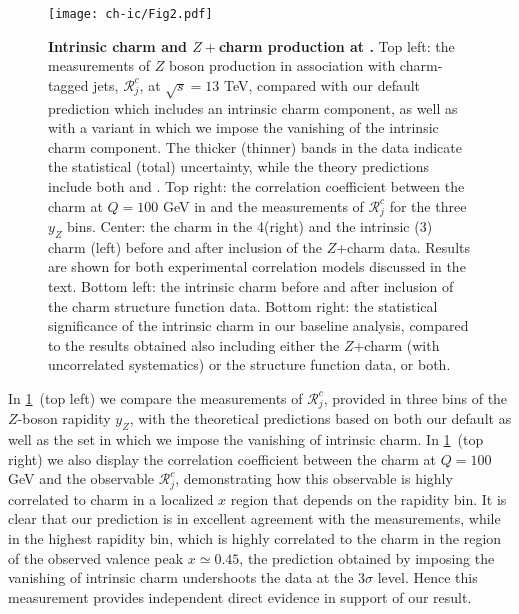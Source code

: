 \begin{figure}[htbp]
  \begin{center}
    \texttt{[image: ch-ic/Fig2.pdf]}
     \caption{\small
        \textbf{ Intrinsic charm and $Z+$charm production at \lhcb.}
        Top left: the \lhcb measurements of $Z$ boson production
        in association with charm-tagged jets, $\mathcal{R}_j^c$, at
        $\sqrt{s}=13$ TeV,  compared with our default prediction which includes
        an intrinsic charm component, as well as with a variant in which we
        impose the vanishing of the intrinsic charm component.
        The thicker (thinner) bands in the \lhcb data indicate the statistical
        (total) uncertainty, while the theory predictions include both \pdf and
        \mhou.
        Top right: the correlation coefficient between the  charm \pdf at $Q=100$
        GeV in  and the \lhcb measurements of $\mathcal{R}_j^c$  for the
        three $y_Z$ bins.
        Center: the charm \pdf in the 4\fns (right) and the intrinsic (3\fns)
        charm \pdf (left) before and after inclusion of the \lhcb $Z$+charm
        data.
        Results are shown for both experimental correlation models discussed in
        the text.
        Bottom left: the intrinsic charm \pdf before and after inclusion of the
        \emc charm structure function data.
        Bottom right: the statistical significance of the intrinsic charm \pdf
        in our baseline analysis, compared to the results obtained also
        including either the \lhcb $Z$+charm (with uncorrelated systematics) or
        the \emc structure function data, or both.
  \label{fig:ic/Zc} }
\end{center}
\end{figure}

In \cref{fig:ic/Zc}~(top left) we compare the \lhcb measurements of
$\mathcal{R}_j^c$, provided in three bins of the $Z$-boson rapidity $y_Z$, with
the theoretical predictions based on both our default \pdfs as well as the \pdf
set in which we impose the vanishing of intrinsic charm.
%
In \cref{fig:ic/Zc}~(top right) we also display the  correlation coefficient
between the  charm \pdf at $Q=100$ GeV  and the observable  $\mathcal{R}_j^c$,
demonstrating how this observable is highly correlated to charm in a localized
$x$ region that depends on the rapidity bin.
%
It is clear that our prediction is in excellent agreement with the \lhcb
measurements, while in the highest rapidity bin, which is highly correlated to
the charm \pdf in the region of the observed valence peak $x\simeq 0.45$, the
prediction obtained by imposing the vanishing of intrinsic charm undershoots
the data at the $3\sigma$ level.
%
Hence this measurement provides independent direct evidence in support of our
result.

